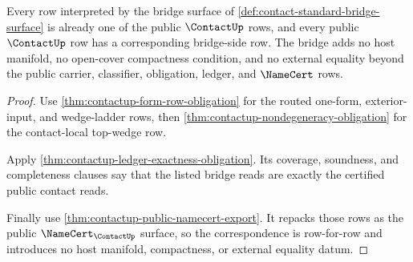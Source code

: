 \begin{theorem}
\label{thm:contact-public-bridge-compatibility}
Every row interpreted by the bridge surface of
\autoref{def:contact-standard-bridge-surface} is already one of the public
$\ContactUp$ rows, and every public $\ContactUp$ row has a corresponding
bridge-side row. The bridge adds no host manifold, no open-cover compactness
condition, and no external equality beyond the public carrier, classifier,
obligation, ledger, and $\NameCert$ rows.
\end{theorem}
\begin{proof}
Use \autoref{thm:contactup-form-row-obligation} for the routed one-form,
exterior-input, and wedge-ladder rows, then
\autoref{thm:contactup-nondegeneracy-obligation} for the contact-local
top-wedge row.

Apply \autoref{thm:contactup-ledger-exactness-obligation}. Its coverage,
soundness, and completeness clauses say that the listed bridge reads are
exactly the certified public contact reads.

Finally use \autoref{thm:contactup-public-namecert-export}. It repacks those
rows as the public $\NameCert_{\ContactUp}$ surface, so the correspondence is
row-for-row and introduces no host manifold, compactness, or external equality
datum.
\end{proof}

